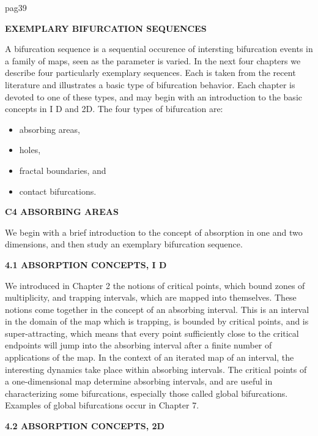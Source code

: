 \documentclass{article}
\begin{document}
pag39

\hfill

\textbf{EXEMPLARY
BIFURCATION
SEQUENCES}

\hfill

A bifurcation sequence is a sequential occurence
of intersting bifurcation events in a family of maps,
seen as the parameter is varied.
In the next four chapters we describe four particularly
exemplary sequences. Each is taken from the
recent literature and illustrates a basic type of bifurcation
behavior. Each chapter is devoted to one of
these types, and may begin with an introduction to
the basic concepts in I D and 2D. The four types of
bifurcation are:

\begin{itemize}
\item absorbing areas,
\item holes,
\item fractal boundaries, and
\item contact bifurcations.
\end{itemize}

\textbf{C4 
ABSORBING AREAS}

\hfill

We begin with a brief introduction to the concept of absorption
in one and two dimensions, and then study an exemplary bifurcation
sequence.


\textbf{4.1 ABSORPTION CONCEPTS, I D}

\hfill

We introduced in Chapter 2 the notions of critical points, which
bound zones of multiplicity, and trapping intervals, which are
mapped into themselves. These notions come together in the concept
of an absorbing interval. This is an interval in the domain of
the map which is trapping, is bounded by critical points, and is
super-attracting, which means that every point sufficiently close to
the critical endpoints will jump into the absorbing interval after a
finite number of applications of the map.
In the context of an iterated map of an interval, the interesting
dynamics take place within absorbing intervals. The critical points
of a one-dimensional map determine absorbing intervals, and are
useful in characterizing some bifurcations, especially those called
global bifurcations. Examples of global bifurcations occur in Chapter
7.

\hfill

\textbf{4.2 ABSORPTION CONCEPTS, 2D}

\hfill
\end{document}
